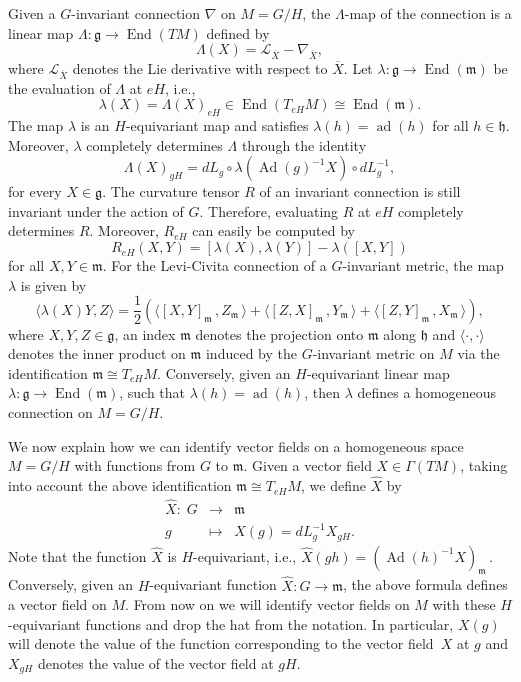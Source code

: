 \documentclass{amsart}
\theoremstyle{plain}
\theoremstyle{remark}
\newcommand\g{{\mathfrak{g}}}
\newcommand\h{{\mathfrak{h}}}
\newcommand\m{{\mathfrak{m}}}
\newcommand\End{\operatorname{End}}
\newcommand\Ad{\operatorname{Ad}}
\newcommand\ad{\operatorname{ad}}
\begin{document}
{Given a $G$-invariant connection $\nabla$ on $M =G/H$, the $\Lambda$-map of the connection is a linear map $\Lambda:\g\to \End(TM)$ defined by
\begin{equation*}
\Lambda(X) = \mathcal{L}_{\overline{X}} - \nabla_{\overline{X}},
\end{equation*}
where $\mathcal{L}_{\overline{X}}$ denotes the Lie derivative with respect to $\overline{X}$.
Let $\lambda:\g\to \End(\m)$ be the evaluation of $\Lambda$ at $eH$, i.e., 
\[
\lambda(X) = \Lambda(X)_{eH}\in \End(T_{eH}M) \cong \End(\m).
\]
The map $\lambda$ is an $H$-equivariant map and satisfies $\lambda(h) = \ad(h)$ for all $h\in \h$. Moreover, $\lambda$ completely determines $\Lambda$ through the identity $$\Lambda(X)_{gH} = dL_g\circ \lambda(\Ad(g)^{-1} X)\circ dL_g^{-1},$$ for every $X\in \g$. The curvature tensor $R$ of an invariant connection is still invariant under the action of $G$. Therefore, evaluating $R$ at $eH$ completely determines $R$. Moreover, $R_{eH}$ can easily be computed by 
\[
R_{eH}(X,Y) = [\lambda(X),\lambda(Y)] - \lambda([X,Y])
\] 
for all $X,Y \in \m$. For the Levi-Civita connection of a $G$-invariant metric, the map $\lambda$ is given by
\begin{equation*}
\langle\lambda(X)Y,Z\rangle = \frac{1}{2}\left(\langle[X,Y]_\m \, ,Z_\m \, \rangle + \langle [Z,X]_\m \, ,Y_\m  \, \rangle + \langle [Z,Y]_\m \, ,X_\m \, \rangle \right),
\end{equation*}
where $X,Y,Z\in \g$, an index $\m$ denotes the projection onto $\m$ along $\h$ and $\langle \cdot, \cdot\rangle$ denotes the inner product on $\m$ induced by the $G$-invariant metric on $M$ via the identification $\m \cong T_{eH}M$. Conversely, given an $H$-equivariant linear map $\lambda:\g\to\End(\m)$, such that $\lambda(h) = \ad(h)$, then $\lambda$ defines a homogeneous connection on $M=G/H$.%

We now explain how we can identify vector fields on a homogeneous space $M=G/H$ with functions from $G$ to $\m$. Given a vector field $X\in \Gamma(TM)$,  taking into account the above identification $\m \cong T_{eH}M$, we define $\hat{X}$ by
\[
\begin{array}{rcl}
\hat X: \; G & \to & \m \\[4pt]
g & \mapsto  & \hat{X}(g) = dL_g^{-1} X_{gH}.
\end{array}
\]
Note that the function $\hat{X}$ is $H$-equivariant, i.e., $\hat{X}(gh) = (\Ad(h)^{-1} X)_\m \, $. Conversely, given an $H$-equivariant function $\hat{X}:G \to \m$, the above formula defines a vector field on $M$. From now on we will identify vector fields on $M$ with these $H$-equivariant functions and drop the hat from the notation. In particular, $X(g)$ will denote the value of the function corresponding to the vector field~$X$ at $g$ and $X_{gH}$ denotes the value of the vector field at $gH$. 

}
\end{document}
